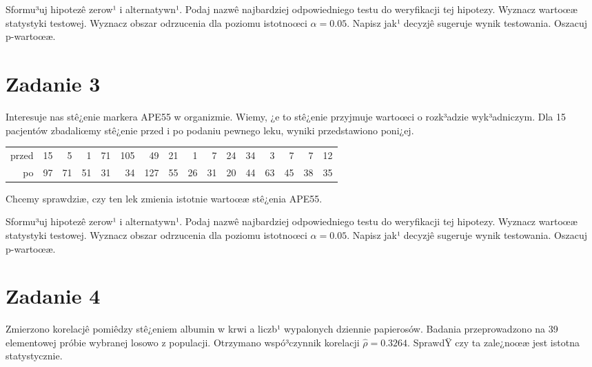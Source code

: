 \documentclass[a4paper,12pt]{article}
\begin{document}
  Sformu³uj hipotezê zerow¹ i alternatywn¹. 
  Podaj nazwê najbardziej odpowiedniego testu do weryfikacji tej hipotezy. 
  Wyznacz wartoœæ statystyki testowej. 
  Wyznacz obszar odrzucenia dla poziomu istotnoœci $\alpha=0.05$. 
  Napisz jak¹ decyzjê sugeruje wynik testowania. Oszacuj p-wartoœæ. \vspace{1cm} 

  \section*{Zadanie 3}
     
  Interesuje nas stê¿enie markera APE55  w organizmie. 
  Wiemy, ¿e to stê¿enie przyjmuje wartoœci o rozk³adzie wyk³adniczym. 
  Dla 15 pacjentów zbadaliœmy stê¿enie przed i po podaniu pewnego leku, 
  wyniki przedstawiono poni¿ej.
  
  \vspace{0.5cm} 
  \noindent\begin{center} 
\begin{tabular}{rrrrrrrrrrrrrrrr}
  \hline
  \hline
przed & 15 & 5 & 1 & 71 & 105 & 49 & 21 & 1 & 7 & 24 & 34 & 3 & 7 & 7 & 12 \\
  po & 97 & 71 & 51 & 31 & 34 & 127 & 55 & 26 & 31 & 20 & 44 & 63 & 45 & 38 & 35 \\
   \hline
\end{tabular}
 
  \end{center} 
  \vspace{0.5cm}
  
  Chcemy sprawdziæ, czy ten lek zmienia istotnie wartoœæ stê¿enia APE55.
  
  Sformu³uj hipotezê zerow¹ i alternatywn¹. 
  Podaj nazwê najbardziej odpowiedniego testu do weryfikacji tej hipotezy. 
  Wyznacz wartoœæ statystyki testowej. 
  Wyznacz obszar odrzucenia dla poziomu istotnoœci $\alpha=0.05$. 
  Napisz jak¹ decyzjê sugeruje wynik testowania. Oszacuj p-wartoœæ. \vspace{1cm} 

  \section*{Zadanie 4}
     
     Zmierzono korelacjê pomiêdzy stê¿eniem albumin w krwi a liczb¹ wypalonych dziennie papierosów. 
     Badania przeprowadzono na 39 elementowej próbie wybranej losowo z populacji. 
     Otrzymano wspó³czynnik korelacji $\hat\rho = 0.3264 $. 
     SprawdŸ czy ta zale¿noœæ jest istotna statystycznie. 
     
\end{document}
